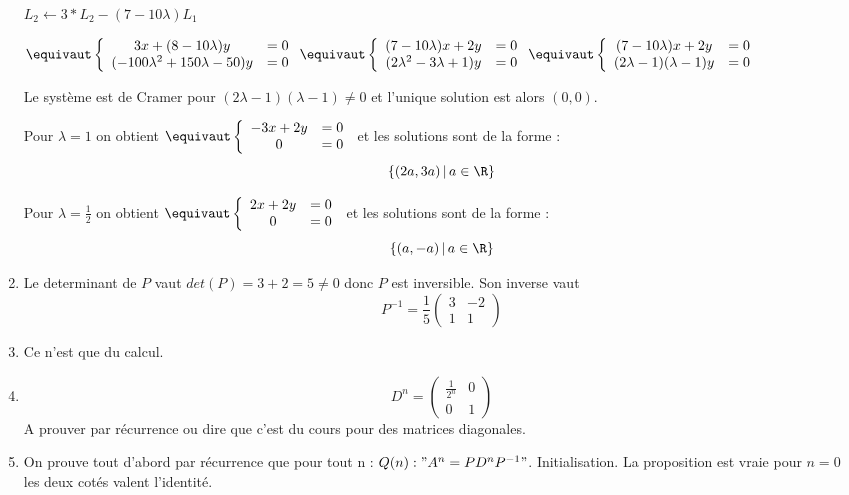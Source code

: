 \begin{correction}
\begin{enumerate}
$L_2 \leftarrow3*L_2- (7-10\lambda)L_1$

$
\equivaut 
\left\{  
\begin{array}{cc}
3x +(8-10\lambda)y  &=0\\
(-100\lambda^2 +150\lambda -50 )y  &=0
\end{array}\right.
\equivaut
\left\{  
\begin{array}{cc}
(7-10\lambda) x +2y  &=0\\
(2\lambda^2 -3\lambda +1) y  &=0
\end{array}\right.
\equivaut
\left\{  
\begin{array}{cc}
(7-10\lambda) x +2y  &=0\\
(2\lambda-1)(\lambda-1) y  &=0
\end{array}\right.
$

Le système est de Cramer pour $(2\lambda-1)(\lambda-1)\neq 0$ et l'unique solution est alors $(0,0)$. 

Pour $\lambda=1$ on obtient 
$\equivaut
\left\{  
\begin{array}{cc}
-3 x +2y  &=0\\
0 &=0
\end{array}\right.
$
et les solutions sont de la forme : 
$$\{ (2a,3a ) \, |\, a\in \R\} $$

Pour $\lambda=\frac{1}{2}$ on obtient 
$\equivaut
\left\{  
\begin{array}{cc}
2 x +2y  &=0\\
0 &=0
\end{array}\right.
$
et les solutions sont de la forme : 
$$\{ (a,-a ) \, |\, a\in \R\} $$

\item Le determinant de $P$ vaut $det(P) = 3+2 = 5 \neq 0$ donc $P$ est inversible. 
Son inverse vaut 
$$P^{-1} = \frac{1}{5} \left( 
\begin{array}{cc}
3 & -2 \\
1 & 1
\end{array}
\right)$$

\item Ce n'est que du calcul. 

\item $$D^n =  \left( 
\begin{array}{cc}
\frac{1}{2^n}& 0 \\
0 & 1
\end{array}
\right)$$
A prouver par récurrence ou  dire que c'est du cours pour des matrices diagonales. 
\item 
On prouve tout d'abord par récurrence que pour tout n :
$Q(n) : " A^n = P D^n P^{-1} "$.
Initialisation. La proposition est vraie pour $n=0$ les deux cotés valent l'identité. 


\end{enumerate}
\end{correction}
